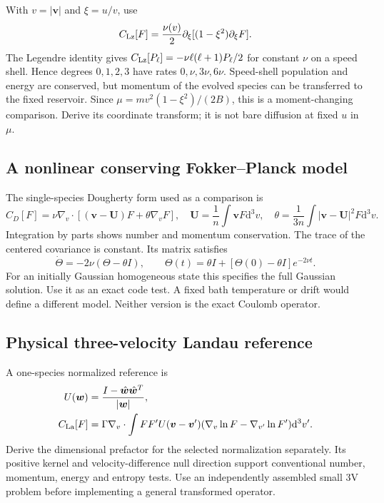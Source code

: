 \documentclass[11pt,letterpaper]{article}
\newcommand{\dd}{\mathrm d}
\begin{document}
With $v=|\bm v|$ and $\xi=u/v$, use
\begin{equation}
 C_{\rm Lz}[F]=\frac{\nu(v)}{2}\partial_\xi
 [(1-\xi^2)\partial_\xi F].
 \label{eq:lorentz}
\end{equation}
The Legendre identity gives $C_{\rm Lz}[P_\ell]=
-\nu\ell(\ell+1)P_\ell/2$ for constant $\nu$ on a speed shell. Hence degrees
$0,1,2,3$ have rates $0,\nu,3\nu,6\nu$. Speed-shell population and energy are
conserved, but momentum of the evolved species can be transferred to the fixed
reservoir. Since $\mu=m v^2(1-\xi^2)/(2B)$, this is a moment-changing comparison.
Derive its coordinate transform; it is not bare diffusion at fixed $u$ in $\mu$.

\subsection*{A nonlinear conserving Fokker--Planck model}

The single-species Dougherty form used as a comparison is
\begin{equation}
 C_D[F]=\nu\nabla_v\cdot[(\bm v-\bm U)F+\theta\nabla_vF],
 \quad \bm U=\frac1n\int\bm vF\dd^3v,
 \quad \theta=\frac{1}{3n}\int|\bm v-\bm U|^2F\dd^3v.
 \label{eq:dougherty}
\end{equation}
Integration by parts shows number and momentum conservation. The trace of the
centered covariance is constant. Its matrix satisfies
\begin{equation}
 \dot\Theta=-2\nu(\Theta-\theta I),\qquad
 \Theta(t)=\theta I+[\Theta(0)-\theta I]e^{-2\nu t}.
 \label{eq:covariance}
\end{equation}
For an initially Gaussian homogeneous state this specifies the full Gaussian
solution. Use it as an exact code test. A fixed bath temperature or drift would
define a different model. Neither version is the exact Coulomb operator.

\subsection*{Physical three-velocity Landau reference}

A one-species normalized reference is
\begin{align}
 U(\bm w)&=\frac{I-\hat{\bm w}\hat{\bm w}^{T}}{|\bm w|},\\
 C_{\rm La}[F]&=\Gamma\nabla_v\cdot\int FF'U(\bm v-\bm v')
 (\nabla_v\ln F-\nabla_{v'}\ln F')\dd^3v'.
 \label{eq:landau}
\end{align}
Derive the dimensional prefactor for the selected normalization separately. Its
positive kernel and velocity-difference null direction support conventional
number, momentum, energy and entropy tests. Use an independently assembled
small 3V problem before implementing a general transformed operator.
\end{document}

